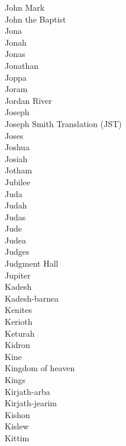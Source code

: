 John Mark  \\
John the Baptist  \\
Jona  \\
Jonah  \\
Jonas  \\
Jonathan  \\
Joppa  \\
Joram  \\
Jordan River  \\
Joseph  \\
Joseph Smith Translation (JST)  \\
Joses  \\
Joshua  \\
Josiah  \\
Jotham  \\
Jubilee  \\
Juda  \\
Judah  \\
Judas  \\
Jude  \\
Judea  \\
Judges  \\
Judgment Hall  \\
Jupiter  \\
Kadesh  \\
Kadesh-barnea  \\
Kenites  \\
Kerioth  \\
Keturah  \\
Kidron  \\
Kine  \\
Kingdom of heaven  \\
Kings  \\
Kirjath-arba  \\
Kirjath-jearim  \\
Kishon  \\
Kislew  \\
Kittim  \\
